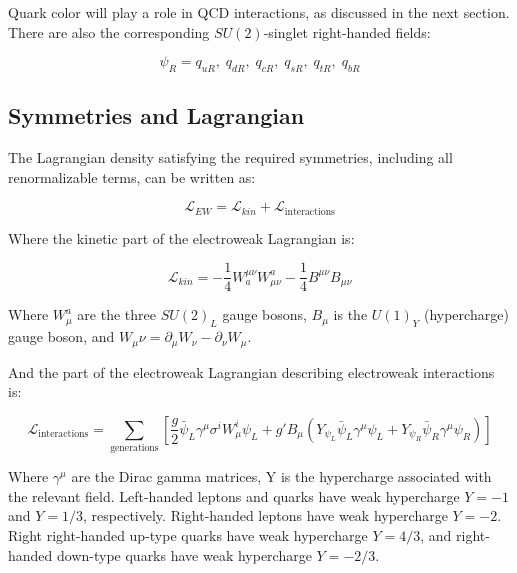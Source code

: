 Quark color will play a role in QCD interactions, as discussed in the next section.
There are also the corresponding $SU(2)$-singlet right-handed fields:

\begin{equation}\label{eq:right_handed_quarks}
\psi_R = q_{uR},\; q_{dR},\; q_{cR},\; q_{sR},\; q_{tR},\; q_{bR}
\end{equation}

\subsection{Symmetries and Lagrangian}\label{subsec:ew_lagrangian}

The Lagrangian density satisfying the required symmetries, including all renormalizable terms, can be written as:

\begin{equation}\label{eq:ew_lagrangian}
    \mathcal{L}_{EW} = \mathcal{L}_{kin} + \mathcal{L}_{\text{interactions}}
\end{equation}

Where the kinetic part of the electroweak Lagrangian is:

\begin{equation}\label{eq:ew_kin}
    \mathcal{L}_{kin} = -\frac{1}{4}W^{\mu \nu}_{a}W_{\mu \nu}^{a}-\frac{1}{4}B^{\mu \nu}B_{\mu \nu}
\end{equation}

Where $W_\mu^a$ are the three $SU(2)_L$ gauge bosons, $B_\mu$ is the $U(1)_Y$ (hypercharge) gauge boson,
and $W_\mu\nu = \partial_{\mu} W_{\nu} - \partial_{\nu} W_{\mu}$.

And the part of the electroweak Lagrangian describing electroweak interactions is:

\begin{equation}\label{eq:ew_int}
    \mathcal{L}_{\text{interactions}} = \sum_{\text{generations}}\left[\frac{g}{2}\bar{\psi}_{L}\gamma^\mu\sigma^i W_\mu^i \psi_L+
    g'B_\mu\left(Y_{\psi_L}\bar{\psi}_L\gamma^\mu\psi_L + Y_{\psi_R}\bar{\psi}_R\gamma^\mu \psi_R\right)\right]
\end{equation}

Where $\gamma^\mu$ are the Dirac gamma matrices, Y is the hypercharge associated with the relevant field.
Left-handed leptons and quarks have weak hypercharge $Y = -1$ and $Y = 1/3$, respectively.
Right-handed leptons have weak hypercharge $Y = -2$. Right right-handed up-type quarks have weak hypercharge $Y = 4/3$,
and right-handed down-type quarks have weak hypercharge $Y = -2/3$.

